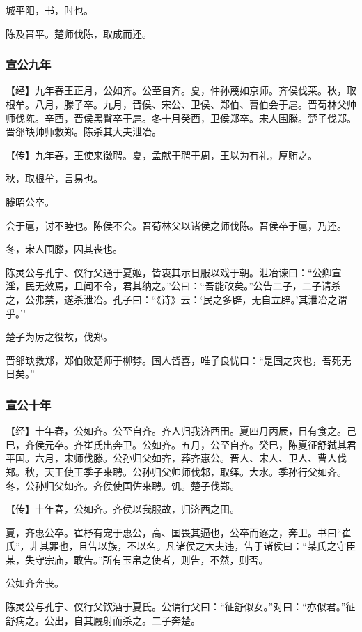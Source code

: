 \documentclass[]{article}
\begin{document}
城平阳，书，时也。

陈及晋平。楚师伐陈，取成而还。

\hypertarget{header-n1384}{%
\subsubsection{宣公九年}\label{header-n1384}}

【经】九年春王正月，公如齐。公至自齐。夏，仲孙蔑如京师。齐侯伐莱。秋，取根牟。八月，滕子卒。九月，晋侯、宋公、卫侯、郑伯、曹伯会于扈。晋荀林父帅师伐陈。辛酉，晋侯黑臀卒于扈。冬十月癸酉，卫侯郑卒。宋人围滕。楚子伐郑。晋郤缺帅师救郑。陈杀其大夫泄冶。

【传】九年春，王使来徵聘。夏，孟献于聘于周，王以为有礼，厚贿之。

秋，取根牟，言易也。

滕昭公卒。

会于扈，讨不睦也。陈侯不会。晋荀林父以诸侯之师伐陈。晋侯卒于扈，乃还。

冬，宋人围滕，因其丧也。

陈灵公与孔宁、仪行父通于夏姬，皆衷其示日服以戏于朝。泄冶谏曰：``公卿宣淫，民无效焉，且闻不令，君其纳之。''公曰：``吾能改矣。''公告二子，二子请杀之，公弗禁，遂杀泄冶。孔子曰：``《诗》云：`民之多辟，无自立辟。'其泄冶之谓乎。''

楚子为厉之役故，伐郑。

晋郤缺救郑，郑伯败楚师于柳棼。国人皆喜，唯子良忧曰：``是国之灾也，吾死无日矣。''

\hypertarget{header-n1396}{%
\subsubsection{宣公十年}\label{header-n1396}}

【经】十年春，公如齐。公至自齐。齐人归我济西田。夏四月丙辰，日有食之。己巳，齐侯元卒。齐崔氏出奔卫。公如齐。五月，公至自齐。癸巳，陈夏征舒弑其君平国。六月，宋师伐滕。公孙归父如齐，葬齐惠公。晋人、宋人、卫人、曹人伐郑。秋，天王使王季子来聘。公孙归父帅师伐邾，取绎。大水。季孙行父如齐。冬，公孙归父如齐。齐侯使国佐来聘。饥。楚子伐郑。

【传】十年春，公如齐。齐侯以我服故，归济西之田。

夏，齐惠公卒。崔杼有宠于惠公，高、国畏其逼也，公卒而逐之，奔卫。书曰``崔氏''，非其罪也，且告以族，不以名。凡诸侯之大夫违，告于诸侯曰：``某氏之守臣某，失守宗庙，敢告。''所有玉帛之使者，则告，不然，则否。

公如齐奔丧。

陈灵公与孔宁、仪行父饮酒于夏氏。公谓行父曰：``征舒似女。''对曰：``亦似君。''征舒病之。公出，自其厩射而杀之。二子奔楚。
\end{document}
